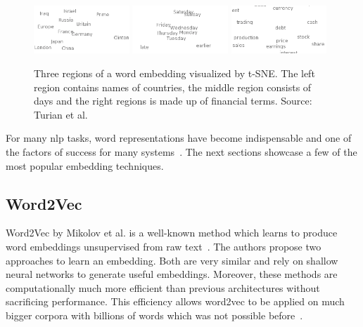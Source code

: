 \begin{figure}[ht]
    \centering
    \includegraphics[width=0.32\textwidth]{figures/03_theory/03_wordEmbeddings1}
    \includegraphics[width=0.32\textwidth]{figures/03_theory/03_wordEmbeddings2}
    \includegraphics[width=0.32\textwidth]{figures/03_theory/03_wordEmbeddings3}
    \caption[\textbf{Three regions of a word embedding visualized by t-SNE.} Source: Turian et al.~\cite{Turian2010} -- Source for full image \url{http://metaoptimize.s3.amazonaws.com/cw-embeddings-ACL2010/embeddings-mostcommon.EMBEDDING_SIZE=50.png}]{Three regions of a word embedding visualized by t-SNE. The left region contains names of countries, the middle region consists of days and the right regions is made up of financial terms. Source: Turian et al.~\cite{Turian2010}\protect\footnotemark}
    \label{fig:03_WordEmbeddings}
\end{figure}

For many \gls{nlp} tasks, word representations have become indispensable and one of the factors of success for many systems~\cite{Luong2013}. The next sections showcase a few of the most popular embedding techniques.

\subsection{Word2Vec}
\label{sec:03_word2vec}

Word2Vec by Mikolov et al. is a well-known method which learns to produce word embeddings unsupervised from raw text~\cite{Mikolov2013}. The authors propose two approaches to learn an embedding. Both are very similar and rely on shallow neural networks to generate useful embeddings. Moreover, these methods are computationally much more efficient than previous architectures without sacrificing performance. This efficiency allows word2vec to be applied on much bigger corpora with billions of words which was not possible before~\cite{Mikolov2013c}.


